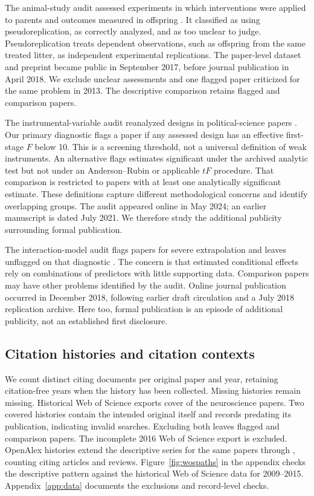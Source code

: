 \documentclass[11pt,letterpaper]{article}
\begin{document}
The animal-study audit assessed \LazicPapers{} experiments in which interventions were applied to parents and outcomes measured in offspring \citep{lazic2018}. It classified \LazicAssessedFlagged{} as using pseudoreplication, \LazicAssessedComparison{} as correctly analyzed, and \LazicUnclear{} as too unclear to judge. Pseudoreplication treats dependent observations, such as offspring from the same treated litter, as independent experimental replications. The paper-level dataset and preprint became public in September 2017, before journal publication in April 2018. We exclude unclear assessments and one flagged paper criticized for the same problem in 2013. The descriptive comparison retains \LazicFlagged{} flagged and \LazicComparison{} comparison papers.

The instrumental-variable audit reanalyzed designs in \LalPapers{} political-science papers \citep{lal2024}. Our primary diagnostic flags a paper if any assessed design has an effective first-stage $F$ below 10. This is a screening threshold, not a universal definition of weak instruments. An alternative flags estimates significant under the archived analytic test but not under an Anderson--Rubin or applicable $tF$ procedure. That comparison is restricted to papers with at least one analytically significant estimate. These definitions capture different methodological concerns and identify overlapping groups. The audit appeared online in May 2024; an earlier manuscript is dated July 2021. We therefore study the additional publicity surrounding formal publication.

The interaction-model audit flags \HmxFlaggedPapers{} papers for severe extrapolation and leaves \HmxComparisonPapers{} unflagged on that diagnostic \citep{hainmueller2019}. The concern is that estimated conditional effects rely on combinations of predictors with little supporting data. Comparison papers may have other problems identified by the audit. Online journal publication occurred in December 2018, following earlier draft circulation and a July 2018 replication archive. Here too, formal publication is an episode of additional publicity, not an established first disclosure.

\subsection{Citation histories and citation contexts}
We count distinct citing documents per original paper and year, retaining citation-free years when the history has been collected. Missing histories remain missing. Historical Web of Science exports cover \Covered{} of the \Classified{} neuroscience papers. Two covered histories contain the intended original itself and records predating its publication, indicating invalid searches. Excluding both leaves \Flagged{} flagged and \Comparison{} comparison papers. The incomplete 2016 Web of Science export is excluded. OpenAlex histories extend the descriptive series for the same papers through \NwPathsLastYear{}, counting citing articles and reviews. Figure~\ref{fig:wospaths} in the appendix checks the descriptive pattern against the historical Web of Science data for 2009--2015. Appendix~\ref{app:data} documents the exclusions and record-level checks.
\end{document}
